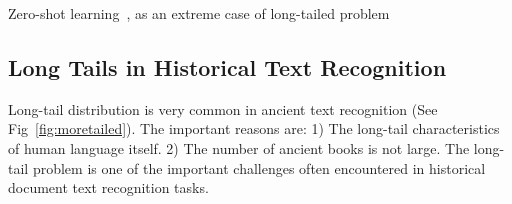 Zero-shot learning~\cite{gzsl-survey}, as an extreme case of long-tailed problem


\subsection{Long Tails in Historical Text Recognition}

Long-tail distribution is very common in ancient text recognition (See Fig~\ref{fig:moretailed}). 
The important reasons are: 1) The long-tail characteristics of human language itself. 2) The number of ancient books is not large. The long-tail problem is one of the important challenges often encountered in historical document text recognition tasks.